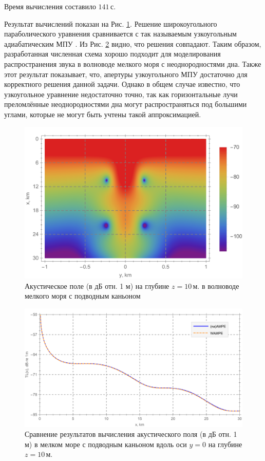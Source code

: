 \documentclass{fefu}
\begin{document}
                Время вычисления составило $141\,\text{с.}$
                \par Результат вычислений показан на Рис. \ref{fig::TLfield}. Решение широкоугольного параболического уравнения сравнивается с так называемым узкоугольным адиабатическим МПУ \cite{jensen,petrov16}. Из Рис. \ref{fig::TLcomp} видно, что решения совпадают. Таким образом, разработанная численная схема хорошо подходит для моделирования распространения звука в волноводе мелкого моря с неоднородностями дна. Также этот результат показывает, что, апертуры узкоугольного МПУ достаточно для корректного решения данной задачи. Однако в общем случае известно, что узкоугольное уравнение недостаточно точно, так как горизонтальные лучи преломлённые неоднородностями дна могут распространяться под большими углами, которые не могут быть учтены такой аппроксимацией.
                \begin{figure}[H]
                    \centering
                    \includegraphics[width=0.49\linewidth]{TLfield}
                    \caption{\label{fig::TLfield}Акустическое поле (в дБ отн. 1 м) на глубине $z=10\,\text{м.}$ в волноводе мелкого моря с подводным каньоном}
                \end{figure}
                \begin{figure}[H]
                    \centering
                    \includegraphics[width=\linewidth]{TLcomp}
                    \caption{\label{fig::TLcomp}Сравнение результатов вычисления акустического поля (в дБ отн. 1 м) в мелком море с подводным каньоном вдоль оси $y=0$ на глубине $z=10\,\text{м.}$}
                \end{figure}
\end{document}
